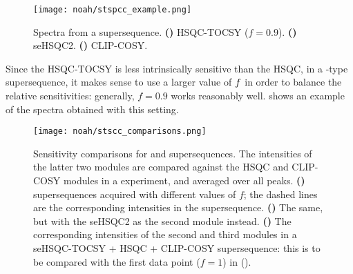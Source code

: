\begin{figure}[!ht]
    \centering
    \texttt{[image: noah/stspcc\_example.png]}%
    {\label{fig:stspcc_example_st}}%
    {\label{fig:stspcc_example_sp}}%
    {\label{fig:stspcc_example_cc}}%
    \caption[Spectra from a  supersequence]{
        Spectra from a  supersequence.
        \textbf{()} HSQC-TOCSY ($f = 0.9$).
        \textbf{()} seHSQC2.
        \textbf{()} CLIP-COSY.
    }
    \label{fig:stspcc_example}
\end{figure}

Since the HSQC-TOCSY is less intrinsically sensitive than the HSQC, in a -type supersequence, it makes sense to use a larger value of $f\/$ in order to balance the relative sensitivities: generally, $f = 0.9$ works reasonably well.
 shows an example of the spectra obtained with this setting.

\begin{figure}[!ht]
    \centering
    \texttt{[image: noah/stscc\_comparisons.png]}%
    {\label{fig:stscc_comparisons_stscc}}%
    {\label{fig:stscc_comparisons_stspcc}}%
    {\label{fig:stscc_comparisons_sehsqc_tocsy}}%
    \caption[Sensitivity comparisons for supersequences containing HSQC-TOCSY module]{
        Sensitivity comparisons for  and  supersequences.
        The intensities of the latter two modules are compared against the HSQC and CLIP-COSY modules in a  experiment, and averaged over all peaks.
        \textbf{()}  supersequences acquired with different values of $f$; the dashed lines are the corresponding intensities in the  supersequence.
        \textbf{()} The same, but with the seHSQC2 as the second module instead.
        \textbf{()} The corresponding intensities of the second and third modules in a seHSQC-TOCSY + HSQC + CLIP-COSY supersequence: this is to be compared with the first data point ($f = 1$) in ().
    }
    \label{fig:stscc_comparisons}
\end{figure}

